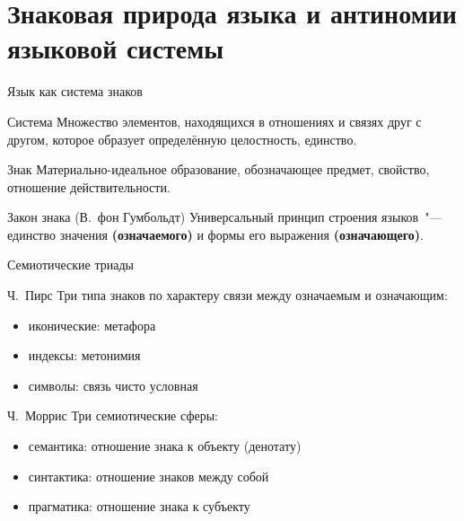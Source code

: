 \frame{\titlepage}

\section{Знаковая природа языка и антиномии языковой системы}

\frame{\tableofcontents[currentsection]}

\begin{frame}{Язык как система знаков}
    \begin{block}{Система}
        Множество элементов, находящихся в отношениях и связях друг с другом, которое образует определённую целостность, единство.
    \end{block}

    \begin{block}{Знак}
        Материально-идеальное образование, обозначающее предмет, свойство, отношение действительности.
    \end{block}

    \vfill

    \begin{alertblock}{Закон знака (В.~фон Гумбольдт)}
        Универсальный принцип строения языков~"--- единство значения \textbf{(означаемого)} и формы его выражения \textbf{(означающего)}.
    \end{alertblock}
\end{frame}

\begin{frame}{Семиотические триады}
    \begin{block}{Ч.~Пирс}
        Три типа знаков по характеру связи между означаемым и означающим: \begin{itemize}
            \item иконические: метафора
            \item индексы: метонимия
            \item символы: связь чисто условная
        \end{itemize}
    \end{block}

    \begin{block}{Ч.~Моррис}
        Три семиотические сферы: \begin{itemize}
            \item семантика: отношение знака к объекту (денотату)
            \item \alert{синтактика}: отношение знаков между собой
            \item прагматика: отношение знака к субъекту
        \end{itemize}
    \end{block}
\end{frame}

